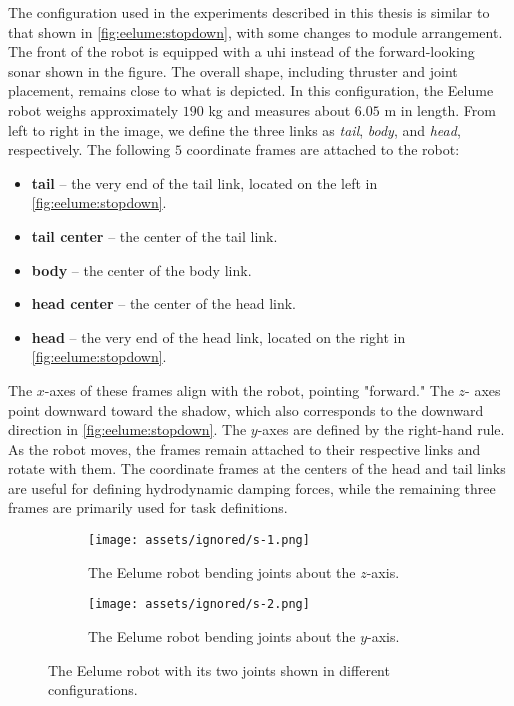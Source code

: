 The configuration used in the experiments described in this thesis is similar 
to that shown in \autoref{fig:eelume:stopdown}, with some changes to module 
arrangement. The front of the robot is equipped with a \gls{uhi} instead of 
the forward-looking sonar shown in the figure. The overall shape, including 
thruster and joint placement, remains close to what is depicted. In this 
configuration, the Eelume robot weighs approximately $190$ kg and measures 
about $6.05$ m in length. From left to right in the image, we define the three 
links as \textit{tail}, \textit{body}, and \textit{head}, respectively. The 
following $5$ coordinate frames are attached to the robot:
\begin{itemize}
\item \textbf{tail} – the very end of the tail link, located on the left in \autoref{fig:eelume:stopdown}.
\item \textbf{tail center} – the center of the tail link.
\item \textbf{body} – the center of the body link.
\item \textbf{head center} – the center of the head link.
\item \textbf{head} – the very end of the head link, located on the right in \autoref{fig:eelume:stopdown}.
\end{itemize}

The $x$-axes of these frames align with the robot, pointing "forward." The $z$-
axes point downward toward the shadow, which also corresponds to the downward 
direction in \autoref{fig:eelume:stopdown}. The $y$-axes are defined by the 
right-hand rule. As the robot moves, the frames remain attached to their 
respective links and rotate with them. The coordinate frames at the centers of 
the head and tail links are useful for defining hydrodynamic damping forces, 
while the remaining three frames are primarily used for task definitions.

\begin{figure}[h!]
\centering
\begin{subfigure}{0.45\textwidth}
\centering
\texttt{[image: assets/ignored/s-1.png]}
\caption{The Eelume robot bending joints about the $z$-axis.}
\label{fig:eelume:joints:1}
\end{subfigure}
\hfill
\begin{subfigure}{0.45\textwidth}
\centering
\texttt{[image: assets/ignored/s-2.png]}
\caption{The Eelume robot bending joints about the $y$-axis.}
\label{fig:eelume:joints:2}
\end{subfigure}
\caption{
The Eelume robot with its two joints shown in different configurations.
}
\label{fig:eelume:joints}
\end{figure}

